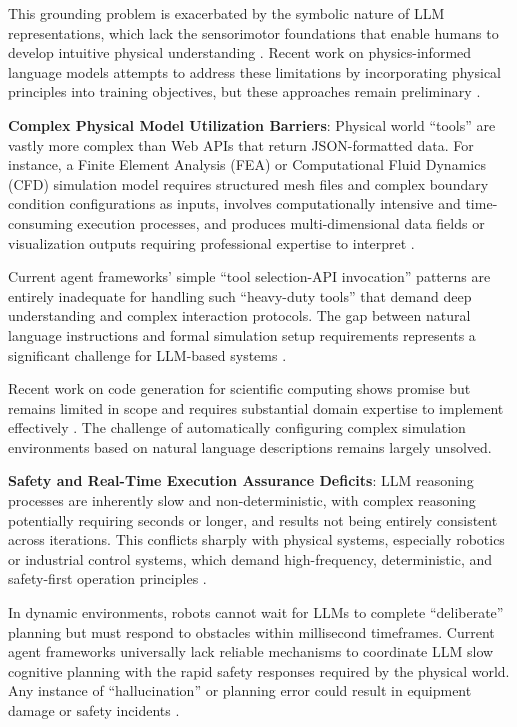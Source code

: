 This grounding problem is exacerbated by the symbolic nature of LLM representations, which lack the sensorimotor foundations that enable humans to develop intuitive physical understanding \cite{harnad1990symbol}. Recent work on physics-informed language models attempts to address these limitations by incorporating physical principles into training objectives, but these approaches remain preliminary \cite{lu2021physics}.

\textbf{Complex Physical Model Utilization Barriers}: Physical world ``tools'' are vastly more complex than Web APIs that return JSON-formatted data. For instance, a Finite Element Analysis (FEA) or Computational Fluid Dynamics (CFD) simulation model requires structured mesh files and complex boundary condition configurations as inputs, involves computationally intensive and time-consuming execution processes, and produces multi-dimensional data fields or visualization outputs requiring professional expertise to interpret \cite{hughes2012finite}.

Current agent frameworks' simple ``tool selection-API invocation'' patterns are entirely inadequate for handling such ``heavy-duty tools'' that demand deep understanding and complex interaction protocols. The gap between natural language instructions and formal simulation setup requirements represents a significant challenge for LLM-based systems \cite{li2023apibank}.

Recent work on code generation for scientific computing shows promise but remains limited in scope and requires substantial domain expertise to implement effectively \cite{chen2021evaluating}. The challenge of automatically configuring complex simulation environments based on natural language descriptions remains largely unsolved.

\textbf{Safety and Real-Time Execution Assurance Deficits}: LLM reasoning processes are inherently slow and non-deterministic, with complex reasoning potentially requiring seconds or longer, and results not being entirely consistent across iterations. This conflicts sharply with physical systems, especially robotics or industrial control systems, which demand high-frequency, deterministic, and safety-first operation principles \cite{thrun2002probabilistic}.

In dynamic environments, robots cannot wait for LLMs to complete ``deliberate'' planning but must respond to obstacles within millisecond timeframes. Current agent frameworks universally lack reliable mechanisms to coordinate LLM slow cognitive planning with the rapid safety responses required by the physical world. Any instance of ``hallucination'' or planning error could result in equipment damage or safety incidents \cite{amodei2016concrete}.

